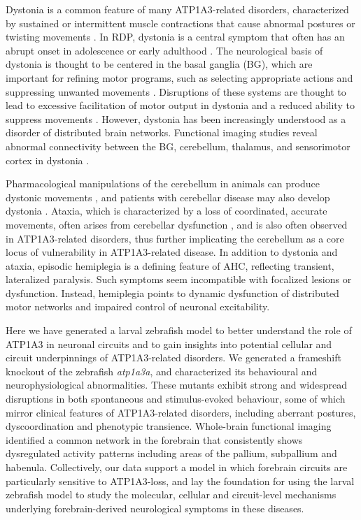 \documentclass[9.5pt,lineno]{RandlettLab_elife}
\begin{document}
Dystonia is a common feature of many ATP1A3-related disorders, characterized by sustained or intermittent muscle contractions that cause abnormal postures or twisting movements \citep{Albanese2013-eo}.
In RDP, dystonia is a central symptom that often has an abrupt onset in adolescence or early adulthood \citep{Haq2019-sf}.
The neurological basis of dystonia is thought to be centered in the basal ganglia (BG), which are important for refining motor programs, such as selecting appropriate actions and suppressing unwanted movements \citep{Mink2018-hi}.
Disruptions of these systems are thought to lead to excessive facilitation of motor output in dystonia and a reduced ability to suppress movements \citep{Mink2003-pf}.
However, dystonia has been increasingly understood as a disorder of distributed brain networks.
Functional imaging studies reveal abnormal connectivity between the BG, cerebellum, thalamus, and sensorimotor cortex in dystonia \citep{Vo2023-sq}.

Pharmacological manipulations of the cerebellum in animals can produce dystonic movements \citep{Calderon2011-no}, and patients with cerebellar disease may also develop dystonia \citep{Alarcon2001-gx}.
Ataxia, which is characterized by a loss of coordinated, accurate movements, often arises from cerebellar dysfunction \citep{Kuo2019-ei}, and is also often observed in ATP1A3-related disorders, thus further implicating the cerebellum as a core locus of vulnerability in ATP1A3-related disease. 
In addition to dystonia and ataxia, episodic hemiplegia is a defining feature of AHC, reflecting transient, lateralized paralysis.
Such symptoms seem incompatible with focalized lesions or dysfunction. 
Instead, hemiplegia points to dynamic dysfunction of distributed motor networks and impaired control of neuronal excitability.

Here we have generated a larval zebrafish model to better understand the role of ATP1A3 in neuronal circuits and to gain insights into potential cellular and circuit underpinnings of ATP1A3-related disorders.
We generated a frameshift knockout of the zebrafish \emph{atp1a3a}, and characterized its behavioural and neurophysiological abnormalities.
These mutants exhibit strong and widespread disruptions in both spontaneous and stimulus-evoked behaviour, some of which mirror clinical features of ATP1A3-related disorders, including aberrant postures, dyscoordination and phenotypic transience.
Whole-brain functional imaging identified a common network in the forebrain that consistently shows dysregulated activity patterns including areas of the pallium, subpallium and habenula.
Collectively, our data support a model in which forebrain circuits are particularly sensitive to ATP1A3-loss, and lay the foundation for using the larval zebrafish model to study the molecular, cellular and circuit-level mechanisms underlying forebrain-derived neurological symptoms in these diseases.
\end{document}
